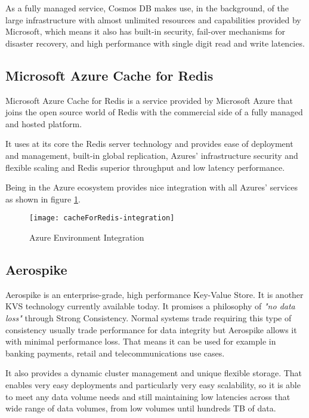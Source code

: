 As a fully managed service, Cosmos DB makes use, in the background, of the large infrastructure with almost unlimited resources and capabilities provided by Microsoft, which means it also has built-in security, fail-over mechanisms for disaster recovery, and high performance with single digit read and write latencies.

\subsection{Microsoft Azure Cache for Redis}
\label{ssec:microsoft_azure_cache_for_redis}

Microsoft Azure Cache for Redis \cite{cache-for-redis:1} is a service provided by Microsoft Azure that joins the open source world of Redis with the commercial side of a fully managed and hosted platform.

It uses at its core the Redis server technology and provides ease of deployment and management, built-in global replication, Azures' infrastructure security and flexible scaling and Redis superior throughput and low latency performance.

Being in the Azure ecosystem provides nice integration with all Azures' services as shown in figure \ref{fig:azure_ecosystem}.

\begin{figure}[htbp]
	\centering
	{\texttt{[image: cacheForRedis-integration]}}%
	\caption{Azure Environment Integration}
	\label{fig:azure_ecosystem}
\end{figure}

\subsection{Aerospike}
\label{ssec:aerospike}

Aerospike \cite{aerospike:1} is an enterprise-grade, high performance Key-Value Store. It is another \gls{KVS} technology currently available today. It promises a philosophy of \textit{"no data loss" } through Strong Consistency. Normal systems trade requiring this type of consistency usually trade performance for data integrity but Aerospike allows it  with minimal performance loss. That means it can be used for example in banking payments, retail and telecommunications use cases.

It also provides a dynamic cluster management and unique flexible storage. That enables very easy deployments and particularly very easy scalability, so it is able to meet any data volume needs and still maintaining low latencies across that wide range of data volumes, from low volumes until hundreds \gls{TB} of data.


